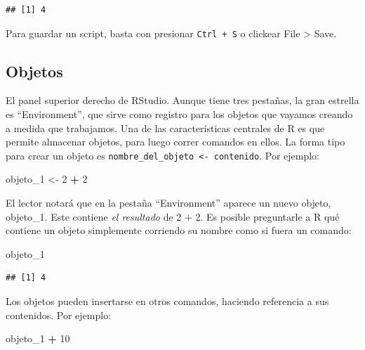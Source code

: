 \documentclass[]{book}
\newenvironment{Shaded}{\begin{snugshade}}{\end{snugshade}}
\newcommand{\DecValTok}[1]{\textcolor[rgb]{0.00,0.00,0.81}{#1}}
\newcommand{\StringTok}[1]{\textcolor[rgb]{0.31,0.60,0.02}{#1}}
\newcommand{\OperatorTok}[1]{\textcolor[rgb]{0.81,0.36,0.00}{\textbf{#1}}}
\newcommand{\NormalTok}[1]{#1}
\begin{document}
\begin{verbatim}
## [1] 4
\end{verbatim}

Para guardar un script, basta con presionar \texttt{Ctrl\ +\ S} o
clickear File \textgreater{} Save.

\subsection{Objetos}\label{objetos}

El panel superior derecho de RStudio. Aunque tiene tres pestañas, la
gran estrella es ``Environment'', que sirve como registro para los
objetos que vayamos creando a medida que trabajamos. Una de las
características centrales de R es que permite almacenar objetos, para
luego correr comandos en ellos. La forma tipo para crear un objeto es
\texttt{nombre\_del\_objeto\ \textless{}-\ contenido}. Por ejemplo:

\begin{Shaded}
\begin{Highlighting}[]
\NormalTok{objeto_}\DecValTok{1}\NormalTok{ <-}\StringTok{ }\DecValTok{2} \OperatorTok{+}\StringTok{ }\DecValTok{2}
\end{Highlighting}
\end{Shaded}

El lector notará que en la pestaña ``Environment'' aparece un nuevo
objeto, objeto\_1. Este contiene \emph{el resultado} de 2 + 2. Es
posible preguntarle a R qué contiene un objeto simplemente corriendo su
nombre como si fuera un comando:

\begin{Shaded}
\begin{Highlighting}[]
\NormalTok{objeto_}\DecValTok{1}
\end{Highlighting}
\end{Shaded}

\begin{verbatim}
## [1] 4
\end{verbatim}

Los objetos pueden insertarse en otros comandos, haciendo referencia a
sus contenidos. Por ejemplo:

\begin{Shaded}
\begin{Highlighting}[]
\NormalTok{objeto_}\DecValTok{1} \OperatorTok{+}\StringTok{ }\DecValTok{10}
\end{Highlighting}
\end{Shaded}
\end{document}
